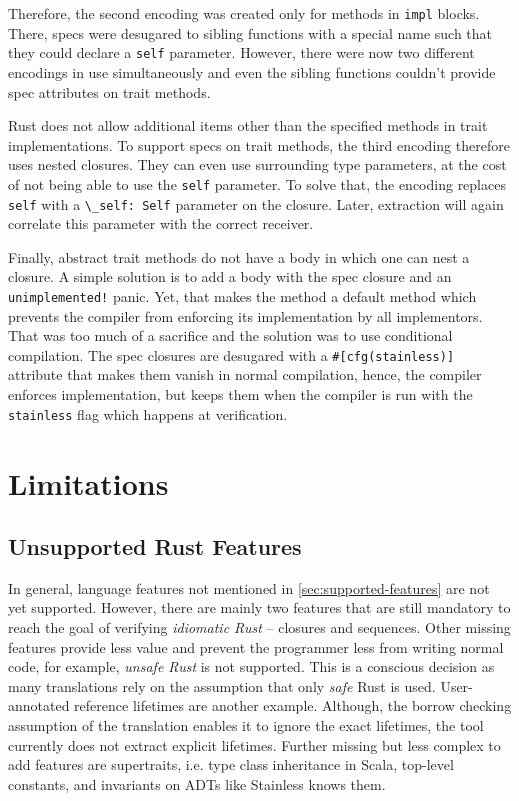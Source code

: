 Therefore, the second encoding was created only for methods in \lstinline!impl!
blocks. There, specs were desugared to sibling functions with a special name
such that they could declare a \lstinline!self! parameter. However, there were
now two different encodings in use simultaneously and even the sibling functions
couldn't provide spec attributes on trait methods.

Rust does not allow additional items other than the specified methods in trait
implementations. To support specs on trait methods, the third encoding therefore
uses nested closures. They can even use surrounding type parameters, at the cost
of not being able to use the \lstinline!self! parameter. To solve that, the
encoding replaces \lstinline!self! with a \passthrough{\lstinline!\_self: Self!}
parameter on the closure. Later, extraction will again correlate this parameter
with the correct receiver.

Finally, abstract trait methods do not have a body in which one can nest a
closure. A simple solution is to add a body with the spec closure and an
\lstinline"unimplemented!" panic. Yet, that makes the method a default method
which prevents the compiler from enforcing its implementation by all
implementors. That  was too much of a sacrifice and the solution was to use
conditional compilation. The spec closures are desugared with a
\lstinline!#[cfg(stainless)]! attribute that makes them vanish in normal
compilation, hence, the compiler enforces implementation, but keeps them when
the compiler is run with the \lstinline!stainless! flag which happens at
verification.



\section{Limitations}
\label{impl-limitations}

\subsection{Unsupported Rust Features}

In general, language features not mentioned in \autoref{sec:supported-features}
are not yet supported. However, there are mainly two features that are still
mandatory to reach the goal of verifying \emph{idiomatic Rust} -- closures and
sequences.  Other missing features provide less value and prevent the programmer
less from writing normal code, for example, \emph{unsafe Rust} is not supported.
This is a conscious decision as many translations rely on the assumption that
only \emph{safe} Rust is used. User-annotated reference lifetimes are another
example. Although, the borrow checking assumption of the translation enables it
to ignore the exact lifetimes, the tool currently does not extract explicit
lifetimes. Further missing but less complex to add features are supertraits,
i.e. type class inheritance in Scala, top-level constants, and invariants on
ADTs like Stainless knows them.

